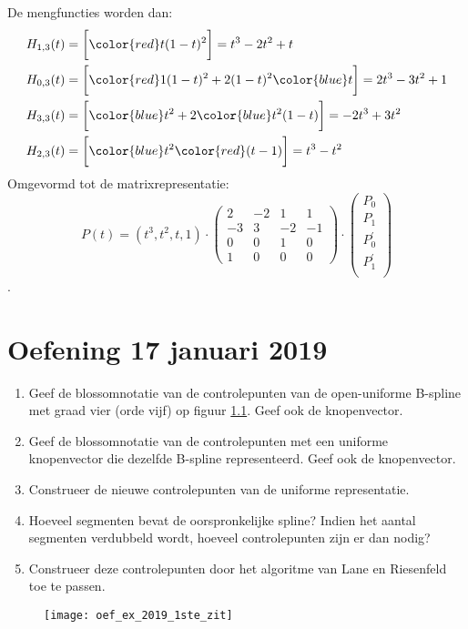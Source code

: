 \begin{itemize}
{\begin{itemize}
				De mengfuncties worden dan:
				\begin{equation*}
					\begin{split}
						H_{1, 3}(t)  & = \bigg[{\color{red}t}(1-t)^2\bigg] = t^3 -2t^2 + t \\
						H_{0, 3}(t)  & = \bigg[{\color{red}1}(1-t)^2 + 2(1-t)^2{\color{blue}t}\bigg]= 2t^3 - 3t^2 + 1\\
						H_{3, 3}(t)  & = \bigg[{\color{blue}t^2} + 2{\color{blue}t^2}(1-t)\bigg] = -2t^3 + 3t^2\\
						H_{2, 3}(t)  & = \bigg[{\color{blue}t^2}{\color{red}(t-1)}\bigg] = t^3 - t^2
					\end{split}
				\end{equation*}
				Omgevormd tot de matrixrepresentatie:
				$$
				P(t) = (t^3, t^2, t, 1) 
				\cdot
				\begin{pmatrix}
					2 & -2 & 1 & 1 \\
					-3 & 3 & -2 & -1 \\
					0 & 0 & 1 & 0 \\
					1 & 0 & 0 & 0
				\end{pmatrix}
				\cdot 
				\begin{pmatrix}
					P_0 \\
					P_1 \\
					P_0^{'} \\
					P_1^{'} \\
				\end{pmatrix}
				$$
				.
		
		\end{itemize}}

\chapter{Oefening 17 januari 2019}
\begin{enumerate}
	\item Geef de blossomnotatie van de controlepunten van de open-uniforme B-spline met graad vier (orde vijf) op figuur \ref{fig:oef_ex_2019_1ste_zit}. Geef ook de knopenvector.
	\item Geef de blossomnotatie van de controlepunten met een uniforme knopenvector die dezelfde B-spline representeerd. Geef ook de knopenvector.
	\item Construeer de nieuwe controlepunten van de uniforme representatie. 
	\item Hoeveel segmenten bevat de oorspronkelijke spline? Indien het aantal segmenten verdubbeld wordt, hoeveel controlepunten zijn er dan nodig?
	\item Construeer deze controlepunten door het algoritme van Lane en Riesenfeld toe te passen.
\end{enumerate}

\begin{figure}[ht]
	\centering
	\texttt{[image: oef\_ex\_2019\_1ste\_zit]}
	\caption{}
	\label{fig:oef_ex_2019_1ste_zit}
\end{figure}

			
\end{itemize}